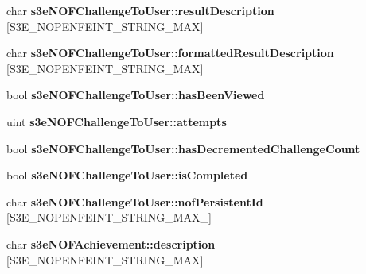 \begin{DoxyCompactItemize}
\item 
\hypertarget{group___n_open_feint_api_group_gab4e3934409e9b81f9a248197c2d11abc}{
char {\bfseries s3eNOFChallengeToUser::resultDescription} \mbox{[}S3E\_\-NOPENFEINT\_\-STRING\_\-MAX\mbox{]}}
\label{group___n_open_feint_api_group_gab4e3934409e9b81f9a248197c2d11abc}

\item 
\hypertarget{group___n_open_feint_api_group_gad29d8e5324ec998f52efea0d9a576359}{
char {\bfseries s3eNOFChallengeToUser::formattedResultDescription} \mbox{[}S3E\_\-NOPENFEINT\_\-STRING\_\-MAX\mbox{]}}
\label{group___n_open_feint_api_group_gad29d8e5324ec998f52efea0d9a576359}

\item 
\hypertarget{group___n_open_feint_api_group_gacf73e9b83740e06275281e4bb9ba1c47}{
bool {\bfseries s3eNOFChallengeToUser::hasBeenViewed}}
\label{group___n_open_feint_api_group_gacf73e9b83740e06275281e4bb9ba1c47}

\item 
\hypertarget{group___n_open_feint_api_group_gac9ac0743b4a7ac1c637dd8d9a2c17f19}{
uint {\bfseries s3eNOFChallengeToUser::attempts}}
\label{group___n_open_feint_api_group_gac9ac0743b4a7ac1c637dd8d9a2c17f19}

\item 
\hypertarget{group___n_open_feint_api_group_gaa6c50239f80d43f2680fe34af1593ba0}{
bool {\bfseries s3eNOFChallengeToUser::hasDecrementedChallengeCount}}
\label{group___n_open_feint_api_group_gaa6c50239f80d43f2680fe34af1593ba0}

\item 
\hypertarget{group___n_open_feint_api_group_ga76d720f4adf95f7561d42f1147fb5c78}{
bool {\bfseries s3eNOFChallengeToUser::isCompleted}}
\label{group___n_open_feint_api_group_ga76d720f4adf95f7561d42f1147fb5c78}

\item 
\hypertarget{group___n_open_feint_api_group_ga9fe56797f1569770d50ef36dda978508}{
char {\bfseries s3eNOFChallengeToUser::nofPersistentId} \mbox{[}S3E\_\-NOPENFEINT\_\-STRING\_\-MAX\_\mbox{]}}
\label{group___n_open_feint_api_group_ga9fe56797f1569770d50ef36dda978508}

\item 
\hypertarget{group___n_open_feint_api_group_ga235b598efac1fa1ac756a36ba9ba5164}{
char {\bfseries s3eNOFAchievement::description} \mbox{[}S3E\_\-NOPENFEINT\_\-STRING\_\-MAX\mbox{]}}
\label{group___n_open_feint_api_group_ga235b598efac1fa1ac756a36ba9ba5164}


\end{DoxyCompactItemize}
